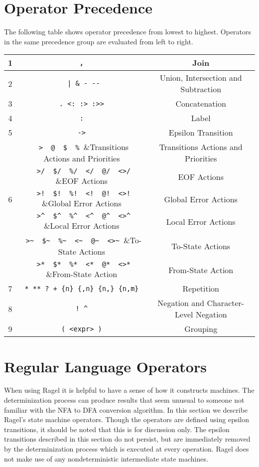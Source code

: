 \documentclass[letterpaper,11pt,oneside]{book}
\newcommand{\verbspace}{\vspace{10pt}}
\begin{document}
\section{Operator Precedence}
The following table shows operator precedence from lowest to highest. Operators
in the same precedence group are evaluated from left to right.

\verbspace
\begin{tabular}{|c|c|c|}
\hline
1&\verb| , |&Join\\
\hline
2&\verb/ | & - --/&Union, Intersection and Subtraction\\
\hline
3&\verb| . <: :> :>> |&Concatenation\\
\hline
4&\verb| : |&Label\\
\hline
5&\verb| -> |&Epsilon Transition\\
\hline
&\verb| >  @  $  % |&Transitions Actions and Priorities\\
\cline{2-3}
&\verb| >/  $/  %/  </  @/  <>/ |&EOF Actions\\
\cline{2-3}
6&\verb| >!  $!  %!  <!  @!  <>! |&Global Error Actions\\
\cline{2-3}
&\verb| >^  $^  %^  <^  @^  <>^ |&Local Error Actions\\
\cline{2-3}
&\verb| >~  $~  %~  <~  @~  <>~ |&To-State Actions\\
\cline{2-3}
&\verb| >*  $*  %*  <*  @*  <>* |&From-State Action\\
\hline
7&\verb| * ** ? + {n} {,n} {n,} {n,m} |&Repetition\\
\hline
8&\verb| ! ^ |&Negation and Character-Level Negation\\
\hline
9&\verb| ( <expr> ) |&Grouping\\
\hline
\end{tabular}

\section{Regular Language Operators}
\label{machconst}

When using Ragel it is helpful to have a sense of how it constructs machines.
The determinization process can produce results that seem unusual to someone
not familiar with the NFA to DFA conversion algorithm. In this section we
describe Ragel's state machine operators. Though the operators are defined
using epsilon transitions, it should be noted that this is for discussion only.
The epsilon transitions described in this section do not persist, but are
immediately removed by the determinization process which is executed at every
operation. Ragel does not make use of any nondeterministic intermediate state
machines. 
\end{document}
